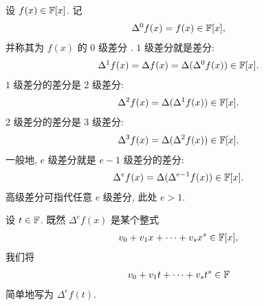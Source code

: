 \begin{definition}
    设 $f(x) \in \mathbb{F}[x]$. 记
    \begin{align*}
        \Delta^0 f(x) = f(x) \in \mathbb{F}[x],
    \end{align*}
    并称其为 $f(x)$ 的 $0$ 级差分 . $1$ 级差分就是差分:
    \begin{align*}
        \Delta^1 f(x) = \Delta f(x) = \Delta (\Delta^0 f(x)) \in \mathbb{F}[x].
    \end{align*}
    $1$ 级差分的差分是 $2$ 级差分:
    \begin{align*}
        \Delta^2 f(x) = \Delta (\Delta^1 f(x)) \in \mathbb{F}[x].
    \end{align*}
    $2$ 级差分的差分是 $3$ 级差分:
    \begin{align*}
        \Delta^3 f(x) = \Delta (\Delta^2 f(x)) \in \mathbb{F}[x].
    \end{align*}
    一般地, $e$ 级差分就是 $e - 1$ 级差分的差分:
    \begin{align*}
        \Delta^e f(x) = \Delta (\Delta^{e-1} f(x)) \in \mathbb{F}[x].
    \end{align*}
    高级差分可指代任意 $e$ 级差分, 此处 $e > 1$.

    设 $t \in \mathbb{F}$. 既然 $\Delta^e f(x)$ 是某个整式
    \begin{align*}
        v_0 + v_1 x + \cdots + v_s x^s \in \mathbb{F}[x],
    \end{align*}
    我们将
    \begin{align*}
        v_0 + v_1 t + \cdots + v_s t^s \in \mathbb{F}
    \end{align*}
    简单地写为 $\Delta^e f(t)$.
\end{definition}


